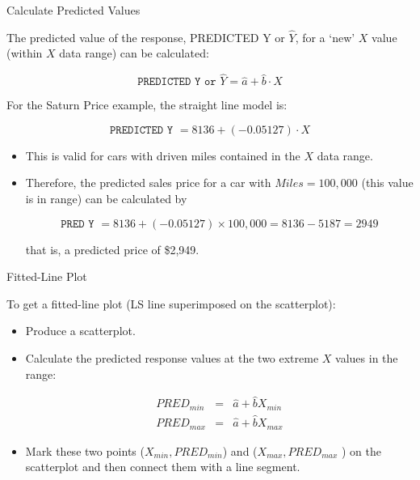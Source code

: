 \documentclass[14pt]{beamer}\usepackage[]{graphicx}\usepackage[]{color}
\begin{document}
\begin{frame}[fragile]{Calculate Predicted Values}

{\footnotesize{
The predicted value of the response, PREDICTED Y or $\hat{Y}$, for a `new' $X$ value (within $X$ data range) can be calculated:

{\footnotesize{
\begin{equation*}
\texttt{PREDICTED Y or } \hat{Y} = \hat{a} + \hat{b} \cdot X
\end{equation*}
}}

\vspace{-5mm}

For the Saturn Price example, the straight line model is:

{\footnotesize{
\begin{equation*}
\texttt{PREDICTED Y } = 8136 + (-0.05127) \cdot X
\end{equation*}
}}

\vspace{-6mm}

\begin{itemize}
\item This is valid for cars with driven miles contained in the $X$ data range.  \item Therefore, the predicted sales price for a car with $Miles = 100,000$ (this value is in range) can be calculated by

\vspace{-4mm}

{\footnotesize{
\begin{equation*}
\texttt{PRED Y } = 8136 + (-0.05127) \times 100,000 = 8136 - 5187 = 2949
\end{equation*}
}}

\vspace{-4mm}

that is, a predicted price of \$2,949.

\end{itemize}
}}
\end{frame}

\begin{frame}[fragile]{Fitted-Line Plot}

{\small{
To get a fitted-line plot (LS line superimposed on the scatterplot):
}}

\begin{itemize}
\item<1-> Produce a scatterplot.
\item<2-> Calculate the predicted response values at the two extreme $X$ values in the range:

{\footnotesize{
\begin{eqnarray*}
  PRED_{min} &=& \hat{a} + \hat{b} X_{min} \\
  PRED_{max} &=& \hat{a} + \hat{b} X_{max}
\end{eqnarray*}
}}

\vspace{-6mm}

\item<3-> Mark these two points ($X_{min}, PRED_{min}$) and ($X_{max}, PRED_{max}$ ) on  the scatterplot and then connect them with a line segment.
\end{itemize}
\end{frame}
\end{document}
